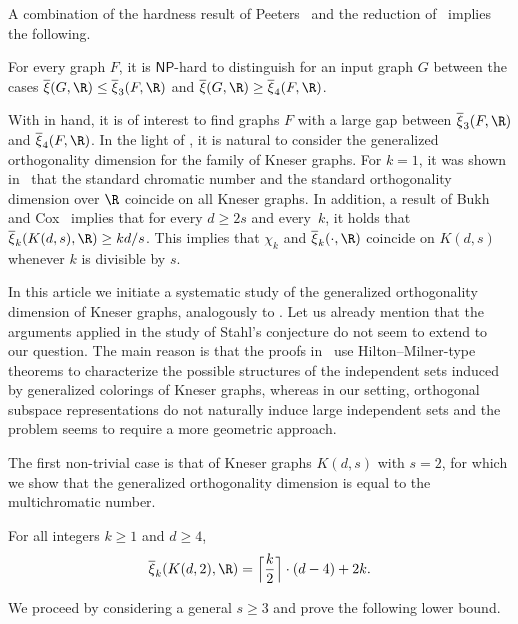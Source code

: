 \documentclass{toc}
\newcommand{\NP}{\mathsf{NP}}
\newcommand{\od}{\overline{\xi}}
\begin{document}
A combination of the hardness result of Peeters~\cite{Peeters96} and the reduction of~\cite{GareyJ76a} implies the following.

\begin{proposition}\label{prop:xi3vs4}
For every graph $F$, it is $\NP$-hard to 
%
%
distinguish for an input graph $G$ between the cases $\od(G,\R) \leq \od_3(F,\R)$ and $\od(G,\R) \geq \od_4(F,\R)$.
\end{proposition}
\noindent
With  in hand, it is of interest to find graphs $F$ with a large gap between $\od_3(F,\R)$ and $\od_4(F,\R)$.
In
the %
light of , it is natural to consider the generalized orthogonality dimension
%
%
for the family of Kneser graphs.
For $k=1$, it was shown in~\cite{Haviv18topo} that the standard chromatic number and the standard orthogonality dimension over $\R$ coincide on all Kneser graphs. In addition, a result of Bukh and Cox~\cite[Proposition~23]{BukhC18} implies that for every $d \geq 2s$ and every~$k$, it holds that $\od_k(K(d,s),\R) \geq kd/s$. This implies that
%
$\chi_k$ and $\od_k(\cdot,\R)$
%
%
%
%
coincide on $K(d,s)$ whenever $k$ is divisible by $s$.

In this %
article  %
we initiate a systematic study of the generalized orthogonality dimension
%
%
of Kneser graphs, analogously to .
Let us already mention that the arguments applied in the study of Stahl's conjecture do not seem to extend to our question.
The main reason is that the proofs in~\cite{Stahl76,GareyJ76a,CGJ78,Stahl98} use Hilton--Milner-type theorems to characterize the possible structures of the independent sets induced by generalized colorings of Kneser graphs, whereas in our setting, orthogonal subspace representations do not naturally induce large independent sets and the problem seems to require a more geometric approach.

The first non-trivial case is that of Kneser graphs $K(d,s)$ with $s=2$, for which we show that the generalized orthogonality dimension
%
is equal to the multichromatic number.  %

\begin{theorem}\label{thm:Intro_s=2}
For all integers $k \geq 1$ and $d \geq 4$,
\[\od_{k}(K(d,2),\R) = \Big \lceil \frac{k}{2} \Big \rceil \cdot (d-4)+2k.\]
\end{theorem}

We proceed by considering a general $s \geq 3$ and prove the following lower bound.
\end{document}
